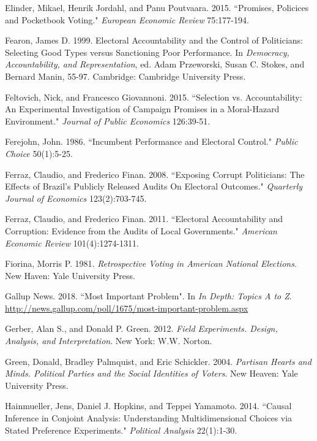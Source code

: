 \documentclass[11pt]{article}
\begin{document}
\begin{thebibliography}{56}
Elinder, Mikael, Henrik Jordahl, and Panu Poutvaara. 2015. “Promises, Policices and Pocketbook Voting." \textit{European Economic Review} 75:177-194.

Fearon, James D. 1999. Electoral Accountability and the Control of Politicians: Selecting Good Types versus Sanctioning Poor Performance. In \textit{Democracy, Accountability, and Representation}, ed. Adam Przeworski, Susan C. Stokes, and Bernard Manin, 55-97. Cambridge: Cambridge University Press.

Feltovich, Nick, and Francesco Giovannoni. 2015. “Selection vs. Accountability: An Experimental Investigation of Campaign Promises in a Moral-Hazard Environment." \textit{Journal of Public Economics} 126:39-51.

Ferejohn, John. 1986. “Incumbent Performance and Electoral Control." \textit{Public Choice} 50(1):5-25.

Ferraz, Claudio, and Frederico Finan. 2008. “Exposing Corrupt Politicians: The Effects of Brazil's Publicly Released Audits On Electoral Outcomes." \textit{Quarterly Journal of Economics} 123(2):703-745.

Ferraz, Claudio, and Frederico Finan. 2011. “Electoral Accountability and Corruption: Evidence from the Audits of Local Governments." \textit{American Economic Review} 101(4):1274-1311.

Fiorina, Morris P. 1981. \textit{Retrospective Voting in American National Elections}. New Haven: Yale University Press.

Gallup News. 2018. “Most Important Problem". In \textit{In Depth: Topics A to Z}. \url{http://news.gallup.com/poll/1675/most-important-problem.aspx}

Gerber, Alan S., and Donald P. Green. 2012. \textit{Field Experiments. Design, Analysis, and Interpretation}. New York: W.W. Norton.

Green, Donald, Bradley Palmquist, and Eric Schickler. 2004. \textit{Partisan Hearts and Minds. Political Parties and the Social Identities of Voters}. New Heaven: Yale University Press.

Hainmueller, Jens, Daniel J. Hopkins, and Teppei Yamamoto. 2014. “Causal Inference in Conjoint Analysis: Understanding Multidimensional Choices via Stated Preference Experiments." \textit{Political Analysis} 22(1):1-30.


\end{thebibliography}
\end{document}
